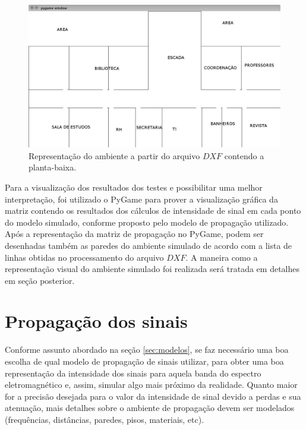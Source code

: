 \documentclass[
	12pt,				%
	twoside,			%
	a4paper,			%
	english,			%
	french,				%
	spanish,			%
	brazil				%
	]{abntex2}
\begin{document}
\begin{figure}[htb]
    \caption{\label{repre_ambiente_dxf_1} Representação do ambiente a partir do arquivo $DXF$ contendo a planta-baixa.}
    \begin{center}
        \includegraphics[scale=0.4]{imagens/planta-labels.jpg}
    \end{center}
\end{figure}

Para a visualização dos resultados dos testes e possibilitar uma melhor
interpretação, foi utilizado o PyGame para prover a visualização gráfica
da matriz contendo os resultados dos cálculos de intensidade de sinal em
cada ponto do modelo simulado, conforme proposto pelo modelo de
propagação utilizado. Após a representação da matriz de propagação no
PyGame, podem ser desenhadas também as paredes do ambiente simulado de
acordo com a lista de linhas obtidas no processamento do arquivo
\(DXF\). A maneira como a representação visual do ambiente simulado foi
realizada será tratada em detalhes em seção posterior.

\section{Propagação dos sinais}\label{propagauxe7uxe3o-dos-sinais}

Conforme assunto abordado na seção \ref{sec:modelos}, se faz necessário
uma boa escolha de qual modelo de propagação de sinais utilizar, para
obter uma boa representação da intensidade dos sinais para aquela banda
do espectro eletromagnético e, assim, simular algo mais próximo da
realidade. Quanto maior for a precisão desejada para o valor da
intensidade de sinal devido a perdas e sua atenuação, mais detalhes
sobre o ambiente de propagação devem ser modelados (frequências,
distâncias, paredes, pisos, materiais, etc).
\end{document}
